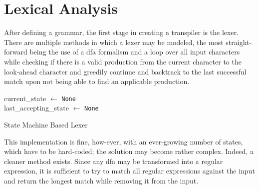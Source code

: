 


\section{Lexical Analysis}
After defining a grammar, the first stage in creating a transpiler is the lexer. There are multiple methods in which a lexer may be modeled, the most straight-forward being the use of a \gls{dfa} formalism and a loop over all input characters while checking if there is a valid production from the current character to the look-ahead character and greedily continue and backtrack to the last successful match upon not being able to find an applicable production.

\begingroup
\vspace{1.5em}
\begin{algorithm}[H]
\setlength{\algomargin}{1.5em}
current\_state $\gets$ \texttt{None}\\
last\_accepting\_state $\gets$ \texttt{None}

    


\caption{State Machine Based Lexer}
\label{alg:lexer-state-based}
\end{algorithm}
\vspace{1.5em}
\endgroup

This implementation is fine, how-ever, with an ever-growing number of states, which have to be hard-coded; the solution may become rather complex. Indeed, a cleaner method exists. Since any \gls{dfa} may be transformed into a regular expression, it is sufficient to try to match all regular expressions against the input and return the longest match while removing it from the input. 


